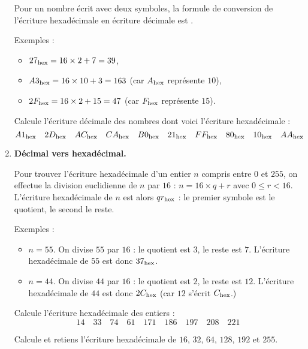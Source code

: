 \documentclass[class=report,crop=false, 12pt]{standalone}
\begin{document}
\begin{activite}[Hexadécimal]
\begin{enumerate}
  Pour un nombre écrit avec deux symboles, la formule de conversion de l'écriture hexadécimale en écriture décimale est .
  
  
  Exemples :
  \begin{itemize}
    \item $27_{\text{hex}} = 16 \times 2 + 7 =  39$,
    
    \item $A3_{\text{hex}} = 16 \times 10 + 3 = 163$ (car $A_{\text{hex}}$ représente $10$),
    
    \item $2F_{\text{hex}} = 16 \times 2 + 15 = 47$ (car $F_{\text{hex}}$ représente $15$).
  \end{itemize}
 
 \bigskip
  
  Calcule l'écriture décimale des nombres dont voici l'écriture hexadécimale :
  $$A1_{\text{hex}} \quad 2D_{\text{hex}} \quad  AC_{\text{hex}} \quad  CA_{\text{hex}} \quad  B0_{\text{hex}} \quad  21_{\text{hex}} \quad  
  FF_{\text{hex}} \quad  80_{\text{hex}} \quad  10_{\text{hex}} \quad  AA_{\text{hex}}$$ 
  
  \item \textbf{Décimal vers hexadécimal.}
  
  Pour trouver l'écriture hexadécimale d'un entier $n$ compris entre $0$ et $255$, on effectue la division euclidienne de 
  $n$ par $16$ : $n = 16 \times q + r$ avec $0 \le r<16$. L'écriture hexadécimale de $n$ est alors $qr_{\text{hex}}$ : le premier symbole est le quotient, le second le reste.
  
   Exemples :
   \begin{itemize}
     \item $n=55$. On divise $55$ par $16$ : le quotient est $3$, le reste est $7$. L'écriture hexadécimale de $55$ est donc $37_{\text{hex}}$.
     
     \item $n=44$. On divise $44$ par $16$ : le quotient est $2$, le reste est $12$. L'écriture hexadécimale de $44$ est donc $2C_{\text{hex}}$ (car $12$ s'écrit $C_{\text{hex}}$.)         
   \end{itemize}   
   
 
 \bigskip
  Calcule l'écriture hexadécimale des entiers :  
  $$14 \quad 33 \quad 74 \quad 61 \quad 171 \quad 186 \quad 197 \quad 208 \quad 221$$
  
  Calcule et retiens l'écriture hexadécimale de $16$, $32$, $64$, $128$, $192$ et $255$.
\end{enumerate}

\end{activite}
\end{document}
